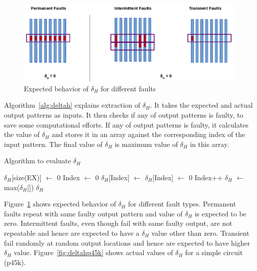 \begin{figure}[h]
  \begin{center}
    \captionsetup{justification=centering}
    \includegraphics[scale=0.65]{figures/deltah.png}
    \caption{Expected behavior of $\delta_H$ for different faults}
    \label{fig:deltah}
  \end{center}
\end{figure}

Algorithm~\ref{alg:deltah} explains extraction of $\delta_H$. It takes the expected and actual output patterns as inputs. It then checks if any of output patterns is faulty, to save some computational efforts. If  any of output patterns is faulty, it calculates the value of $\delta_H$ and stores it in an array against the corresponding index of the input pattern. The final value of $\delta_H$ is maximum value of $\delta_H$ in this array. 

\begin{algorithm}[H]
  \caption{Algorithm to evaluate $\delta_H$}
  \label{alg:deltah}
  \begin{algorithmic}
 \State $\delta_H$[size(EX)] $\leftarrow$ 0\;
 \State Index $\leftarrow$ 0\;
   \State $\delta_H$[Index] $\leftarrow$ \;
  \Else
   \State $\delta_H$[Index] $\leftarrow$ 0\;
  \EndIf
  \State Index++\;
 \EndWhile
 \State$\delta_H$ $\leftarrow$ max($\delta_H$[])\;
 \State \Return $\delta_H$\;
 \EndProcedure
 \end{algorithmic}
\end{algorithm}

Figure~\ref{fig:deltah} shows expected behavior of $\delta_H$ for different fault types. Permanent faults repeat with same faulty output pattern and value of $\delta_H$ is expected to be zero. Intermittent faults, even though fail with same faulty output, are not repeatable and hence are expected to have a $\delta_H$ value other than zero. Transient fail randomly at random output locations and hence are expected to have higher $\delta_H$ value. Figure~\ref{fig:deltahp45k} shows actual values of $\delta_H$ for a simple circuit (p45k).

